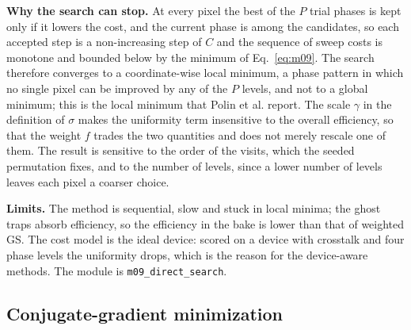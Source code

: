 \textbf{Why the search can stop.} At every pixel the best of the $P$ trial phases is kept only if it lowers the cost, and the current phase is among the candidates, so each accepted step is a non-increasing step of $C$ and the sequence of sweep costs is monotone and bounded below by the minimum of Eq.~\eqref{eq:m09}. The search therefore converges to a coordinate-wise local minimum, a phase pattern in which no single pixel can be improved by any of the $P$ levels, and not to a global minimum; this is the local minimum that Polin et al. report. The scale $\gamma$ in the definition of $\sigma$ makes the uniformity term insensitive to the overall efficiency, so that the weight $f$ trades the two quantities and does not merely rescale one of them. The result is sensitive to the order of the visits, which the seeded permutation fixes, and to the number of levels, since a lower number of levels leaves each pixel a coarser choice.

\textbf{Limits.} The method is sequential, slow and stuck in local minima; the ghost traps absorb efficiency, so the efficiency in the bake is lower than that of weighted GS. The cost model is the ideal device: scored on a device with crosstalk and four phase levels the uniformity drops, which is the reason for the device-aware methods. The module is \texttt{m09\_direct\_search}.

\subsection{Conjugate-gradient minimization}\label{sec:m10}

